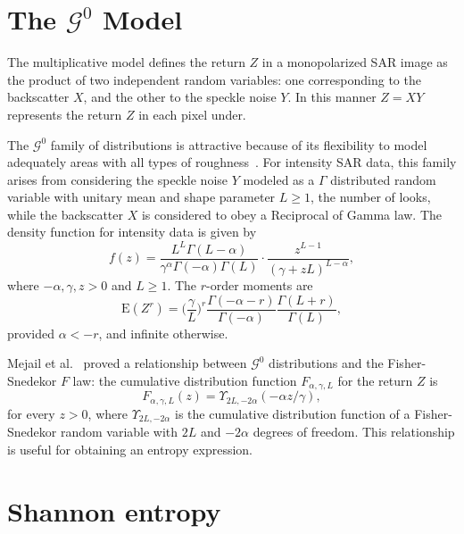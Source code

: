 \documentclass[journal]{IEEEtran}
\begin{document}
\section{The $\mathcal{G}^0$ Model}
\label{sec_SAR}

The multiplicative model defines the return $Z$ in a monopolarized SAR image as the product of two independent random variables: one corresponding to the backscatter $X$, and the other to the speckle noise $Y$.
In this manner $Z=X Y$ represents the return $Z$ in each pixel under.

The $\mathcal{G}^{0}$ family of distributions is attractive because of its flexibility to model adequately areas with all types of roughness~\cite{MejailJacoboFreryBustos:IJRS,mejailfreryjacobobustos2001}. 
For intensity SAR data, this family arises from considering the speckle noise $Y$ modeled as a $\Gamma$ distributed random variable with unitary mean and shape parameter $L\geq1$, the number of looks, while the backscatter $X$ is considered to obey a Reciprocal of Gamma law.  
The density function for intensity data is given by
\begin{equation}
f(z) =\frac{L^{L}\Gamma ( L-\alpha
	) }{\gamma ^{\alpha }\Gamma ( -\alpha ) \Gamma (
	L) }\cdot  
\frac{z^{L-1}}{( \gamma +zL) ^{L-\alpha }},%
\label{}
\end{equation}
where $-\alpha,\gamma ,z>0$ and $L\geq 1$. 
The $r$-order moments are
\begin{equation}
\text{E}(Z^r) =\Big(\frac{\gamma}{L}\Big)^r\frac{\Gamma ( -\alpha-r )}{ \Gamma (-\alpha) }
\frac{\Gamma (L+r )}{\Gamma (L)},
\label{moments_gI0}
\end{equation}
provided $\alpha<-r$, and infinite otherwise.

Mejail et al.~\cite{MejailJacoboFreryBustos:IJRS} proved a relationship between $\mathcal G^0$ distributions and the Fisher-Snedekor $F$ law:
the cumulative distribution function $F_{\alpha,\gamma,L}$ for the return $Z$ is
\begin{equation}
F_{\alpha,\gamma,L}(z) = \Upsilon_{2L, -2\alpha}(-\alpha  z / \gamma),
	\label{eq:CDFG0}
\end{equation}
for every $z>0$, where $\Upsilon_{2L, -2\alpha}$ is the cumulative distribution function of a Fisher-Snedekor random variable with $2L$ and $-2\alpha$ degrees of freedom.
This relationship is useful for obtaining an entropy expression. 

\section{Shannon entropy}
\end{document}
